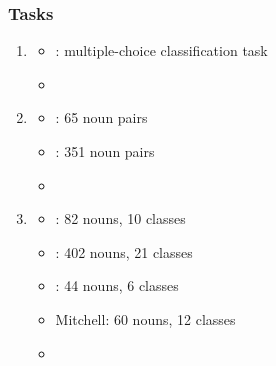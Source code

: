 \documentclass[t]{beamer} %
\begin{document}
\begin{frame}
  \frametitle{Tasks}

  \begin{enumerate}
  \item {}
    \begin{itemize}
    \item {}: multiple-choice classification task\\ \citep{Landauer:Dumais:97}
    \item[]
    \end{itemize}
  \item {}
    \begin{itemize}
    \item {}: 65 noun pairs \citep{Rubenstein:Goodenough:65}
    \item {}: 351 noun pairs \citep{Finkelstein:etc:02}
    \item[]
    \end{itemize}  
  \item {} 
    \begin{itemize} 
    \item {}: 82 nouns, 10 classes \citep{VanOverschelde:Rawson:Dunlosky:04}
    \item {}: 402 nouns, 21 classes \citep{Almuhareb:06}
    \item {}: 44 nouns, 6 classes
    \item Mitchell: 60 nouns, 12 classes \citep{Mitchell:etc:08}
    \item[]
    \end{itemize}   
  \end{enumerate}
\end{frame}
\end{document}
